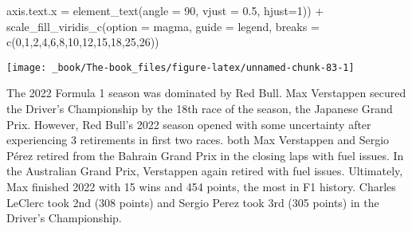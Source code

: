 \documentclass[
]{book}
\newenvironment{Shaded}{\begin{snugshade}}{\end{snugshade}}
\newcommand{\AttributeTok}[1]{\textcolor[rgb]{0.77,0.63,0.00}{#1}}
\newcommand{\DecValTok}[1]{\textcolor[rgb]{0.00,0.00,0.81}{#1}}
\newcommand{\FloatTok}[1]{\textcolor[rgb]{0.00,0.00,0.81}{#1}}
\newcommand{\FunctionTok}[1]{\textcolor[rgb]{0.00,0.00,0.00}{#1}}
\newcommand{\NormalTok}[1]{#1}
\newcommand{\SpecialCharTok}[1]{\textcolor[rgb]{0.00,0.00,0.00}{#1}}
\newcommand{\StringTok}[1]{\textcolor[rgb]{0.31,0.60,0.02}{#1}}
\begin{document}
\begin{Shaded}
\begin{Highlighting}[]
        \AttributeTok{axis.text.x =} \FunctionTok{element\_text}\NormalTok{(}\AttributeTok{angle =} \DecValTok{90}\NormalTok{, }\AttributeTok{vjust =} \FloatTok{0.5}\NormalTok{, }\AttributeTok{hjust=}\DecValTok{1}\NormalTok{)) }\SpecialCharTok{+}
  \FunctionTok{scale\_fill\_viridis\_c}\NormalTok{(}\AttributeTok{option =} \StringTok{\textquotesingle{}magma\textquotesingle{}}\NormalTok{,}
                       \AttributeTok{guide =} \StringTok{\textquotesingle{}legend\textquotesingle{}}\NormalTok{,}
                       \AttributeTok{breaks =} \FunctionTok{c}\NormalTok{(}\DecValTok{0}\NormalTok{,}\DecValTok{1}\NormalTok{,}\DecValTok{2}\NormalTok{,}\DecValTok{4}\NormalTok{,}\DecValTok{6}\NormalTok{,}\DecValTok{8}\NormalTok{,}\DecValTok{10}\NormalTok{,}\DecValTok{12}\NormalTok{,}\DecValTok{15}\NormalTok{,}\DecValTok{18}\NormalTok{,}\DecValTok{25}\NormalTok{,}\DecValTok{26}\NormalTok{))}
\end{Highlighting}
\end{Shaded}

\begin{center}\texttt{[image: \_book/The-book\_files/figure-latex/unnamed-chunk-83-1]} \end{center}

The 2022 Formula 1 season was dominated by Red Bull. Max Verstappen secured the Driver's Championship by the 18th race of the season, the Japanese Grand Prix. However, Red Bull's 2022 season opened with some uncertainty after experiencing 3 retirements in first two races. both Max Verstappen and Sergio Pérez retired from the Bahrain Grand Prix in the closing laps with fuel issues. In the Australian Grand Prix, Verstappen again retired with fuel issues. Ultimately, Max finished 2022 with 15 wins and 454 points, the most in F1 history. Charles LeClerc took 2nd (308 points) and Sergio Perez took 3rd (305 points) in the Driver's Championship.
\end{document}
